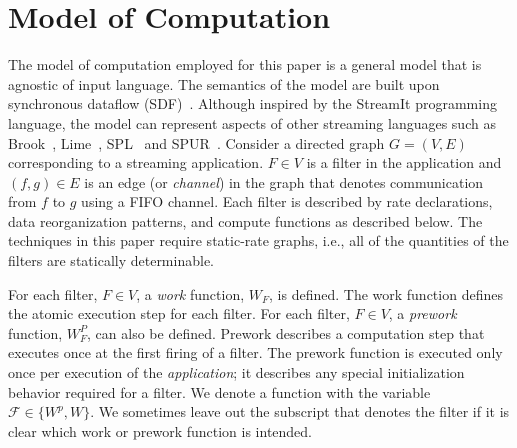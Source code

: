 \vspace{-4pt}
\section{Model of Computation}
\label{model}

The model of computation employed for this paper is a general model
that is agnostic of input language.  The semantics of the model are
built upon synchronous dataflow (SDF)~\cite{leeSDF}.  Although
inspired by the StreamIt programming language, the model can represent
aspects of other streaming languages such as Brook~\cite{brook04},
Lime~\cite{lime10}, SPL~\cite{spl09} and SPUR~\cite{spur05samos}.
Consider a directed graph $G = (V, E)$ corresponding to a streaming
application. $F \in V$ is a filter in the application and $(f, g) \in
E$ is an edge (or {\it channel}) in the graph that denotes
communication from $f$ to $g$ using a FIFO channel.  Each filter is
described by rate declarations, data reorganization patterns,
and compute functions as described below. The techniques in this paper
require static-rate graphs, i.e., all of the quantities of the filters
are statically determinable.



For each filter, $F \in V$, a {\it work} function, $W_F$, is defined.
The work function defines the atomic execution step for each filter.
For each filter, $F \in V$, a {\it prework} function, $W_F^P$, can
also be defined.  Prework describes a computation step that executes
once at the first firing of a filter.  The prework function is
executed only once per execution of the {\it application}; it
describes any special initialization behavior required for a
filter. We denote a function with the variable $\mathcal{F} \in \{W^p,
W\}$.  We sometimes leave out the subscript that denotes the filter if
it is clear which work or prework function is intended.

